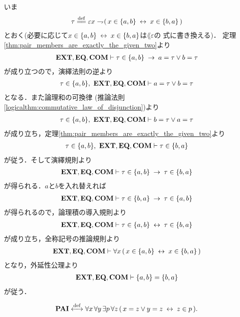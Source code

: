 	\begin{sketch}
		いま
		\begin{align}
			\tau \defeq \varepsilon x \negation (\, x \in \{a,b\} \lrarrow x \in \{b,a\}\, )
		\end{align}
		とおく(必要に応じて$x \in \{a,b\} \hspace{0.25em}\leftrightarrow\hspace{0.25em} x \in \{b,a\}$は$\lang{\varepsilon}$の
		式に書き換える)．
		定理\ref{thm:pair_members_are_exactly_the_given_two}より
		\begin{align}
			\mbox{{\bf EXT}},\mbox{{\bf EQ}},\mbox{\bf COM} \vdash
			\tau \in \{a,b\} \hspace{0.25em}\rightarrow\hspace{0.25em} a = \tau \vee b = \tau
		\end{align}
		が成り立つので，演繹法則の逆より
		\begin{align}
			\tau \in \{a,b\},\ \mbox{{\bf EXT}},\mbox{{\bf EQ}},\mbox{\bf COM} \vdash a = \tau \vee b = \tau
		\end{align}
		となる．また論理和の可換律
		(推論法則\ref{logicalthm:commutative_law_of_disjunction})より
		\begin{align}
			\tau \in \{a,b\},\ \mbox{{\bf EXT}},\mbox{{\bf EQ}},\mbox{\bf COM} \vdash b = \tau \vee a = \tau
		\end{align}
		が成り立ち，定理\ref{thm:pair_members_are_exactly_the_given_two}より
		\begin{align}
			\tau \in \{a,b\},\ \mbox{{\bf EXT}},\mbox{{\bf EQ}},\mbox{\bf COM} \vdash \tau \in \{b,a\}
		\end{align}
		が従う．そして演繹規則より
		\begin{align}
			\mbox{{\bf EXT}},\mbox{{\bf EQ}},\mbox{\bf COM} \vdash \tau \in \{a,b\} \hspace{0.25em}\rightarrow\hspace{0.25em} \tau \in \{b,a\}
		\end{align}
		が得られる．$a$と$b$を入れ替えれば
		\begin{align}
			\mbox{{\bf EXT}},\mbox{{\bf EQ}},\mbox{\bf COM} \vdash \tau \in \{b,a\} \hspace{0.25em}\rightarrow\hspace{0.25em} \tau \in \{a,b\}
		\end{align}
		が得られるので，論理積の導入規則より
		\begin{align}
			\mbox{{\bf EXT}},\mbox{{\bf EQ}},\mbox{\bf COM} \vdash \tau \in \{a,b\} \hspace{0.25em}\leftrightarrow\hspace{0.25em} \tau \in \{b,a\}
		\end{align}
		が成り立ち，全称記号の推論規則より
		\begin{align}
			\mbox{{\bf EXT}},\mbox{{\bf EQ}},\mbox{\bf COM} \vdash \forall x\, (\, x \in \{a,b\} \hspace{0.25em}\leftrightarrow\hspace{0.25em} x \in \{b,a\}\, )
		\end{align}
		となり，外延性公理より
		\begin{align}
			\mbox{{\bf EXT}},\mbox{{\bf EQ}},\mbox{\bf COM} \vdash \{a,b\} = \{b,a\}
		\end{align}
		が従う．
		\QED
	\end{sketch}
		
	\begin{screen}
		\begin{axm}[対の公理]
			\begin{align}
				\mbox{{\bf PAI}} \overset{\mathrm{def}}{\longleftrightarrow} \forall x\, \forall y\, \exists p\, \forall z\, 
				(\, x = z \vee y = z \hspace{0.25em}\leftrightarrow\hspace{0.25em} z \in p\, ).
			\end{align}
		\end{axm}
	\end{screen}
	
